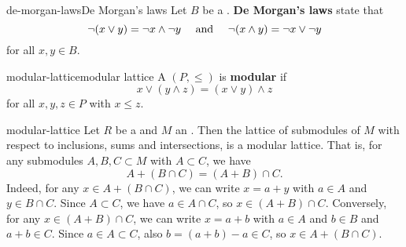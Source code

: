 \begin{topic}{de-morgan-laws}{De Morgan's laws}
    Let $B$ be a . \textbf{De Morgan's laws} state that
    \[ \neg (x \lor y) = \neg x \land \neg y \quad \textup{ and } \quad \neg (x \land y) = \neg x \lor \neg y \]
    for all $x, y \in B$.
\end{topic}

\begin{topic}{modular-lattice}{modular lattice}
    A  $(P, \le)$ is \textbf{modular} if
    \[ x \lor (y \land z) = (x \lor y) \land z \]
    for all $x, y, z \in P$ with $x \le z$.
\end{topic}

\begin{example}{modular-lattice}
    Let $R$ be a  and $M$ an . Then the lattice of submodules of $M$ with respect to inclusions, sums and intersections, is a modular lattice. That is, for any submodules $A, B, C \subset M$ with $A \subset C$, we have
    \[ A + (B \cap C) = (A + B) \cap C . \]
    Indeed, for any $x \in A + (B \cap C)$, we can write $x = a + y$ with $a \in A$ and $y \in B \cap C$. Since $A \subset C$, we have $a \in A \cap C$, so $x \in (A + B) \cap C$. Conversely, for any $x \in (A + B) \cap C$, we can write $x = a + b$ with $a \in A$ and $b \in B$ and $a + b \in C$. Since $a \in A \subset C$, also $b = (a + b) - a \in C$, so $x \in A + (B \cap C)$.
\end{example}
